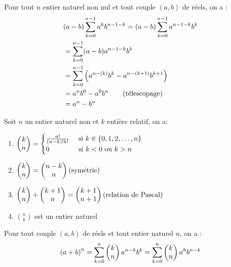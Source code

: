 \begin{dem}
	Pour tout \(n\) entier naturel non nul et tout couple \((a,b)\) de réels, on a :
	\begin{align*}
		 & (a-b)\sum_{k=0}^{n-1} a^kb^{n-1-k}   = (a-b)\sum_{k=0}^{n-1} a^{n-1-k}b^k \\
		 & = \sum_{k=0}^{n-1}   (a-b)    a^{n-1-k}b^k                                \\
		 & = \sum_{k=0}^{n-1}  \paren{ a^{n-(k)}b^k  - a^{n-(k+1)}b^{k+1}  }         \\
		 & = a^nb^0 - a^0b^n                \qquad \text{(télescopage)}              \\
		 & = a^n-b^n
	\end{align*}
\end{dem}
\begin{defprop}
	Soit \(n\) un entier naturel non et \(k\) entière relatif, on a:
	\begin{enumerate}
		\item \(\binom{n}{k} = \begin{cases}
			      \frac{n!}{(n-k)!k!} & \text{ si } k \in \accol{0,1,2,\ldots,n} \\
			      0                   & \text{ si } k <0 \text{ ou } k>n
		      \end{cases}\) \\
		\item \(\binom{n}{k} = \binom{n}{n-k} \hfill \text{(symétrie)}\)
		\item \(\binom{n}{k} +\binom{n}{k+1} = \binom{n+1}{k+1} \hfill \text{(relation de Pascal)}\)
		\item \(\binom{n}{k} \) est un entier naturel
	\end{enumerate}
\end{defprop}

\begin{defprop}
	Pour tout couple \((a,b)\) de réels et tout entier naturel \(n\), on a :
	\[\paren{a+b}^n = \sum_{k=0}^n \binom{n}{k} a^{n-k}b^k = \sum_{k=0}^n \binom{n}{k} a^{k}b^{n-k}\]
\end{defprop}

